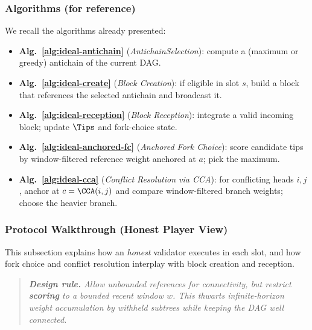 \subsubsection{Algorithms (for reference)}
We recall the algorithms already presented:
\begin{itemize}
  \item \textbf{Alg.~\ref{alg:ideal-antichain}} (\emph{AntichainSelection}): compute a (maximum or greedy) antichain of the current DAG.
  \item \textbf{Alg.~\ref{alg:ideal-create}} (\emph{Block Creation}): if eligible in slot $s$, build a block that references the selected antichain and broadcast it.
  \item \textbf{Alg.~\ref{alg:ideal-reception}} (\emph{Block Reception}): integrate a valid incoming block; update $\Tips$ and fork-choice state.
  \item \textbf{Alg.~\ref{alg:ideal-anchored-fc}} (\emph{Anchored Fork Choice}): score candidate tips by window-filtered reference weight anchored at $a$; pick the maximum.
  \item \textbf{Alg.~\ref{alg:ideal-cca}} (\emph{Conflict Resolution via CCA}): for conflicting heads $i,j$, anchor at $c=\CCA(i,j)$ and compare window-filtered branch weights; choose the heavier branch.
\end{itemize}

\subsubsection{Protocol Walkthrough (Honest Player View)}
\label{subsec:ideal-walkthrough}
This subsection explains how an \emph{honest} validator executes \ProjIdeal in each slot, and how fork choice and conflict resolution interplay with block creation and reception.


\begin{quote}\itshape
\textbf{Design rule.} \emph{Allow unbounded references for connectivity, but restrict \textbf{scoring} to a bounded recent window $w$.} 
This thwarts infinite-horizon weight accumulation by withheld subtrees while keeping the DAG well connected.
\end{quote}


